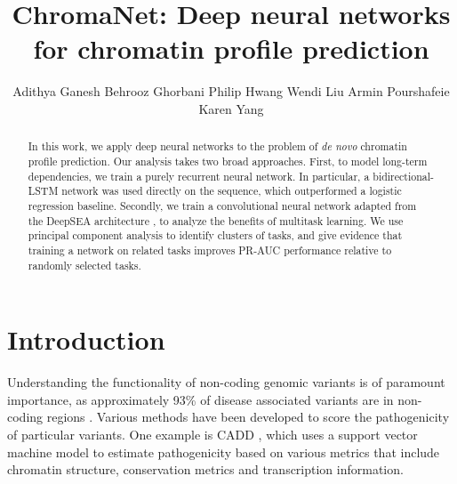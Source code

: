 \documentclass{article}
\title{ChromaNet: Deep neural networks for chromatin profile prediction}
\author{ %
  Adithya Ganesh \And Behrooz Ghorbani \And Philip Hwang \AND Wendi Liu  \And Armin Pourshafeie  \And Karen Yang
}
\begin{document}

\maketitle

\begin{abstract}
In this work, we apply deep neural networks to the problem of {\it de novo} chromatin profile prediction.  Our analysis takes two broad approaches.  First, to model long-term dependencies, we train a purely recurrent neural network.  In particular, a bidirectional-LSTM network was used directly on the sequence, which outperformed a logistic regression baseline.  Secondly, we train a convolutional neural network adapted from the DeepSEA architecture \cite{zhou2015predicting}, to analyze the benefits of multitask learning. We use principal component analysis to identify clusters of tasks, and give evidence that training a network on related tasks improves PR-AUC performance relative to randomly selected tasks.



%
%
\end{abstract}

\section{Introduction}
Understanding the functionality of non-coding genomic variants is of paramount importance, as approximately 93\% of disease associated variants are in non-coding regions \cite{maurano2012systematic}. Various methods have been developed to score the pathogenicity of particular variants.  One example is CADD \cite{kircher2014general}, which uses a support vector machine model to estimate pathogenicity based on various metrics that include chromatin structure, conservation metrics and transcription information. 
\end{document}
